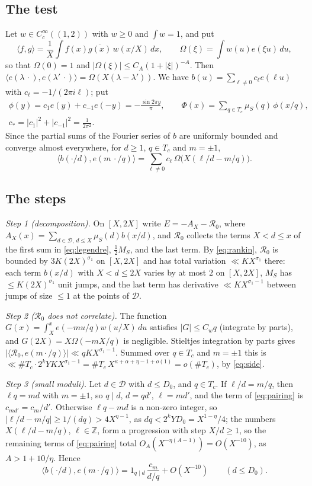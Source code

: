 \documentclass[11pt]{amsart}
\theoremstyle{remark}
\numberwithin{equation}{section}
\newcommand{\Z}{\mathbb{Z}}
\newcommand{\cD}{\mathcal{D}}
\newcommand{\cR}{\mathcal{R}}
\begin{document}
\subsection{The test}
Let $w\in C_c^\infty((1,2))$ with $w\ge0$ and $\int w=1$, and put
\[
\langle f,g\rangle=\frac1X\int f(x)\overline{g(x)}\,w(x/X)\,dx,\qquad \Omega(\xi)=\int w(u)e(\xi u)\,du,
\]
so that $\Omega(0)=1$ and $|\Omega(\xi)|\le C_A(1+|\xi|)^{-A}$. Then $\langle e(\lambda\,\cdot),e(\lambda'\,\cdot)\rangle=\Omega(X(\lambda-\lambda'))$. We have $b(u)=\sum_{\ell\ne0}c_\ell e(\ell u)$ with $c_\ell=-1/(2\pi i\ell)$; put
\begin{gather*}
\phi(y)=c_1e(y)+c_{-1}e(-y)=-\frac{\sin2\pi y}{\pi},\qquad \Phi(x)=\sum_{q\in T_c}\mu_S(q)\,\phi(x/q),\\
c_*=|c_1|^2+|c_{-1}|^2=\frac1{2\pi^2}.
\end{gather*}
Since the partial sums of the Fourier series of $b$ are uniformly bounded and converge almost everywhere, for $d\ge1$, $q\in T_c$ and $m=\pm1$,
\begin{equation}\label{eq:pairing}
\langle b(\cdot/d),e(m\,\cdot/q)\rangle=\sum_{\ell\ne0}c_\ell\,\Omega\bigl(X(\ell/d-m/q)\bigr).
\end{equation}

\subsection{The steps}
\emph{Step 1 (decomposition).} On $[X,2X]$ write $E=-A_X-\cR_0$, where $A_X(x)=\sum_{d\in\cD,\,d\le X}\mu_S(d)b(x/d)$, and $\cR_0$ collects the terms $X<d\le x$ of the first sum in \eqref{eq:legendre}, $\tfrac12M_S$, and the last term. By \eqref{eq:rankin}, $\cR_0$ is bounded by $3K(2X)^{\sigma_1}$ on $[X,2X]$ and has total variation $\ll KX^{\sigma_1}$ there: each term $b(x/d)$ with $X<d\le2X$ varies by at most $2$ on $[X,2X]$, $M_S$ has $\le K(2X)^{\sigma_1}$ unit jumps, and the last term has derivative $\ll KX^{\sigma_1-1}$ between jumps of size $\le1$ at the points of $\cD$.

\emph{Step 2 ($\cR_0$ does not correlate).} The function $G(x)=\int_X^xe(-mu/q)w(u/X)\,du$ satisfies $|G|\le C_wq$ (integrate by parts), and $G(2X)=X\Omega(-mX/q)$ is negligible. Stieltjes integration by parts gives $|\langle\cR_0,e(m\cdot/q)\rangle|\ll qKX^{\sigma_1-1}$. Summed over $q\in T_c$ and $m=\pm1$ this is $\ll\#T_c\cdot2^kYKX^{\sigma_1-1}=\#T_c\,X^{\kappa+\alpha+\eta-1+o(1)}=o(\#T_c)$, by \eqref{eq:side}.

\emph{Step 3 (small moduli).} Let $d\in\cD$ with $d\le D_0$, and $q\in T_c$. If $\ell/d=m/q$, then $\ell q=md$ with $m=\pm1$, so $q\mid d$, $d=qd'$, $\ell=md'$, and the term of \eqref{eq:pairing} is $c_{md'}=c_m/d'$. Otherwise $\ell q-md$ is a non-zero integer, so $|\ell/d-m/q|\ge1/(dq)>4X^{\eta-1}$, as $dq<2^kYD_0=X^{1-\eta}/4$; the numbers $X(\ell/d-m/q)$, $\ell\in\Z$, form a progression with step $X/d\ge1$, so the remaining terms of \eqref{eq:pairing} total $O_A(X^{-\eta(A-1)})=O(X^{-10})$, as $A>1+10/\eta$. Hence
\begin{equation}\label{eq:small}
\langle b(\cdot/d),e(m\cdot/q)\rangle=1_{q\mid d}\,\frac{c_m}{d/q}+O(X^{-10})\qquad(d\le D_0).
\end{equation}
\end{document}
